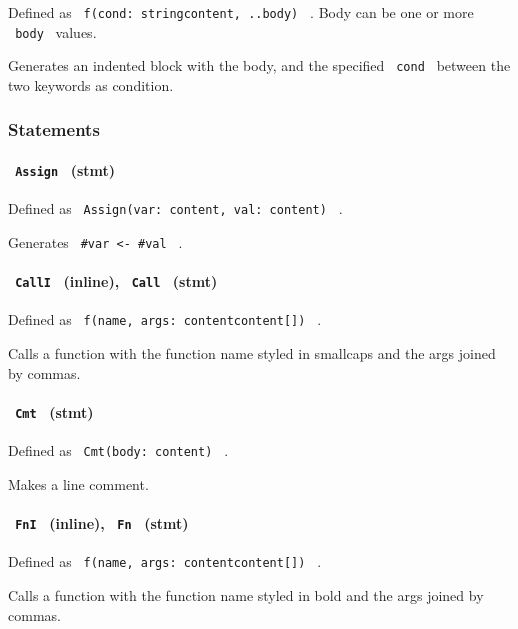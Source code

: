 Defined as \texttt{\ f(cond:\ string\textbar{}content,\ ..body)\ } .
Body can be one or more \texttt{\ body\ } values.

Generates an indented block with the body, and the specified
\texttt{\ cond\ } between the two keywords as condition.

\subsubsection{Statements}\label{statements}

\paragraph{\texorpdfstring{\texttt{\ Assign\ }
(stmt)}{ Assign  (stmt)}}\label{assign-stmt}

Defined as \texttt{\ Assign(var:\ content,\ val:\ content)\ } .

Generates \texttt{\ \#var\ \textless{}-\ \#val\ } .

\paragraph{\texorpdfstring{\texttt{\ CallI\ } (inline),
\texttt{\ Call\ }
(stmt)}{ CallI  (inline),  Call  (stmt)}}\label{calli-inline-call-stmt}

Defined as \texttt{\ f(name,\ args:\ content\textbar{}content{[}{]})\ }
.

Calls a function with the function name styled in smallcaps and the args
joined by commas.

\paragraph{\texorpdfstring{\texttt{\ Cmt\ }
(stmt)}{ Cmt  (stmt)}}\label{cmt-stmt}

Defined as \texttt{\ Cmt(body:\ content)\ } .

Makes a line comment.

\paragraph{\texorpdfstring{\texttt{\ FnI\ } (inline), \texttt{\ Fn\ }
(stmt)}{ FnI  (inline),  Fn  (stmt)}}\label{fni-inline-fn-stmt}

Defined as \texttt{\ f(name,\ args:\ content\textbar{}content{[}{]})\ }
.

Calls a function with the function name styled in bold and the args
joined by commas.

